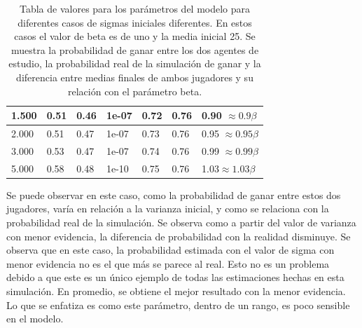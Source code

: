 \documentclass[11pt,twoside, spanish]{report} %
\begin{document}
\begin{table}[H]
{\begin{tabular}{|l|l|l|l|l|l|l|}
1.500                                   & 0.51                                   & 0.46                                     & 1e-07                                  & 0.72                                                 & 0.76                                            & 0.90 $ \approx 0.9\beta$                      \\ \hline
2.000                                   & 0.51                                    & 0.47                                    & 1e-07                                  & 0.73                                                 & 0.76                                            & 0.95 $ \approx 0.95\beta$                     \\ \hline
3.000                                   & 0.53                                    & 0.47                                     & 1e-07                                  & 0.74                                                 & 0.76                                            & 0.99 $ \approx 0.99\beta$                     \\ \hline
5.000                                   & 0.58                                   & 0.48                                     & 1e-10                                  & 0.75                                                 & 0.76                                            & 1.03$ \approx 1.03\beta$                      \\ \hline
\end{tabular}%
}
\caption{Tabla de valores para los par\'ametros del modelo para diferentes casos de sigmas iniciales diferentes. En estos casos el valor de beta es de uno y la media inicial 25. Se muestra la probabilidad de ganar entre los dos agentes de estudio, la probabilidad real de la simulaci\'on de ganar y la diferencia entre medias finales de ambos jugadores y su relaci\'on con el par\'ametro beta.}
\label{tab:sigma}
\end{table}

%


Se puede observar en este caso, como la probabilidad de ganar entre estos dos jugadores, var\'ia en relaci\'on a la varianza inicial, y como se relaciona con la probabilidad real de la simulaci\'on.
Se observa como a partir del valor de varianza con menor evidencia, la diferencia de probabilidad con la realidad disminuye.
Se observa que en este caso, la probabilidad estimada con el valor de sigma con menor evidencia no es el que m\'as se parece al real.
Esto no es un problema debido a que este es un \'unico ejemplo de todas las estimaciones hechas en esta simulaci\'on.
En promedio, se obtiene el mejor resultado con la menor evidencia.
Lo que se enfatiza es como este par\'ametro, dentro de un rango, es poco sensible en el modelo.
\end{document}
